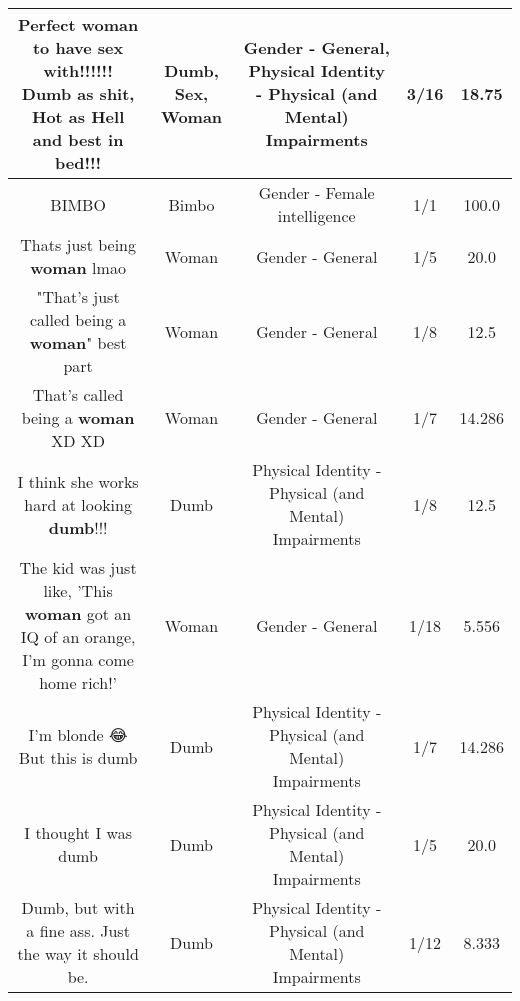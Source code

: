 \documentclass[11pt]{article}
\newlength\mylength
\begin{document}
\begin{center}
\begin{longtable}{|C{.65\mylength}|C{.30\mylength}|C{.12\mylength}|C{.12\mylength}|C{.12\mylength}|}
  \small Perfect \textbf{woman} to have \textbf{sex} with!!!!!! \textbf{Dumb} as shit, Hot as Hell and best in bed!!!\normalsize   & Dumb, Sex, Woman & Gender - General, Physical Identity - Physical (and Mental) Impairments & 3/16 & 18.75 \\  \hline
  \small BIMBO\normalsize   & Bimbo & Gender - Female intelligence & 1/1 & 100.0 \\  \hline
  \small Thats just being \textbf{woman} lmao\normalsize   & Woman & Gender - General & 1/5 & 20.0 \\  \hline
  \small "That's just called being a \textbf{woman}" best part\normalsize   & Woman & Gender - General & 1/8 & 12.5 \\  \hline
  \small That's called being a \textbf{woman} XD XD\normalsize   & Woman & Gender - General & 1/7 & 14.286 \\  \hline
  \small I think she works hard at looking \textbf{dumb}!!!\normalsize   & Dumb & Physical Identity - Physical (and Mental) Impairments & 1/8 & 12.5 \\  \hline
  \small The kid was just like, 'This \textbf{woman} got an IQ of an orange, I'm gonna come home rich!'\normalsize   & Woman & Gender - General & 1/18 & 5.556 \\  \hline
  \small I'm blonde 😂But this is dumb\normalsize   & Dumb & Physical Identity - Physical (and Mental) Impairments & 1/7 & 14.286 \\  \hline
  \small I thought I was dumb\normalsize   & Dumb & Physical Identity - Physical (and Mental) Impairments & 1/5 & 20.0 \\  \hline
  \small Dumb, but with a fine ass. Just the way it should be.\normalsize   & Dumb & Physical Identity - Physical (and Mental) Impairments & 1/12 & 8.333 \\  \hline

\end{longtable}
\end{center}
\end{document}
